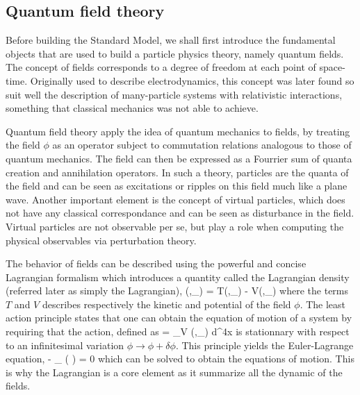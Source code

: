         \subsection{Quantum field theory}

    Before building the Standard Model, we shall first introduce the fundamental objects
    that are used to build a particle physics theory, namely quantum fields. The concept
    of fields corresponds to a degree of freedom at each point of space-time. Originally
    used to describe electrodynamics, this concept was later found so suit well the
    description of many-particle systems with relativistic interactions, something that
    classical mechanics was not able to achieve.

    Quantum field theory apply the idea of quantum mechanics to fields, by treating the
    field $\phi$ as an operator subject to commutation relations analogous to those of
    quantum mechanics. The field can then be expressed as a Fourrier sum of quanta
    creation and annihilation operators. In such a theory, particles are the quanta of the
    field and can be seen as excitations or ripples on this field much like a plane wave.
    Another important element is the concept of virtual particles, which does not have
    any classical correspondance and can be seen as disturbance in the field. Virtual
    particles are not observable per se, but play a role when computing the physical
    observables via perturbation theory.

    The behavior of fields can be described using the powerful and concise Lagrangian
    formalism which introduces a quantity called the Lagrangian density (referred later
    as simply the Lagrangian),
    {
        (\phi,\partial_\mu \phi)
        =
        T(\phi,\partial_\mu \phi) - V(\phi,\partial_\mu \phi)
    }
    where the terms $T$ and $V$ describes respectively the kinetic and potential of the
    field $\phi$. The least action principle states that one can obtain the equation of
    motion of a system by requiring that the action, defined as
    {
        =
        \int_V (\phi,\partial_\mu \phi) d^4x
    }
    is stationnary with respect to an infinitesimal variation $\phi \rightarrow \phi +
    \delta\phi$. This principle yields the Euler-Lagrange equation,
    {
        -
        \partial_\mu
        \left(
        \right)
        =
        0
    }
    which can be solved to obtain the equations of motion. This is why the Lagrangian is
    a core element as it summarize all the dynamic of the fields.

